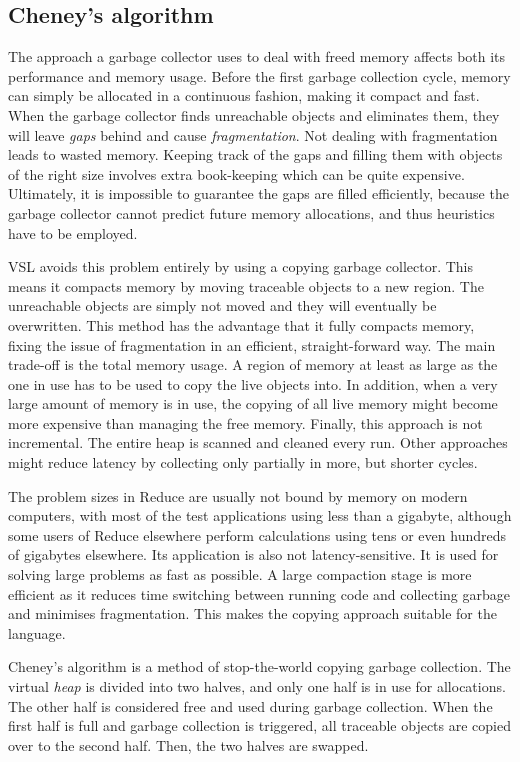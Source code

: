 \subsection{Cheney's algorithm}
The approach a garbage collector uses to deal with freed memory affects both its performance and memory usage.
Before the first garbage collection cycle, memory can simply be allocated in a continuous fashion, making it
compact and fast. When the garbage collector finds unreachable objects and eliminates them, they will leave \emph{gaps} behind
and cause \emph{fragmentation}. Not dealing with fragmentation leads to wasted memory. Keeping track of the gaps
and filling them with objects of the right size involves extra book-keeping which can be quite expensive. Ultimately,
it is impossible to guarantee the gaps are filled efficiently, because the garbage collector cannot predict future
memory allocations, and thus heuristics have to be employed.

VSL avoids this problem entirely by using a copying garbage collector. This means it compacts memory by moving
traceable objects to a new region. The unreachable objects are simply not moved and they will eventually be overwritten.
This method has the advantage that it fully compacts memory, fixing the issue of fragmentation in an efficient,
straight-forward way. The main trade-off is the total memory usage. A region of memory at least
as large as the one in use has to be used to copy the live objects into. In addition, when a very large amount
of memory is in use, the copying of all live memory might become more expensive than managing the free memory.
Finally, this approach is not incremental. The entire heap is scanned and cleaned every run. Other approaches might
reduce latency by collecting only partially in more, but shorter cycles.

The problem sizes in Reduce are usually not bound by memory on modern computers, with most of the test applications
using less than a gigabyte, although some users of Reduce elsewhere perform calculations
using tens or even hundreds of gigabytes elsewhere. Its application is also not latency-sensitive. It is used for
solving large problems as fast as possible. A large compaction stage is more efficient as it reduces time
switching between running code and collecting garbage and minimises fragmentation.
This makes the copying approach suitable for the language.

Cheney's algorithm \cite{cheney} is a method of stop-the-world copying garbage collection. The virtual \emph{heap} is divided into
two halves, and only one half is in use for allocations. The other half is considered free and used during garbage
collection. When the first half is full and garbage collection is triggered, all traceable objects are copied over
to the second half. Then, the two halves are swapped.

